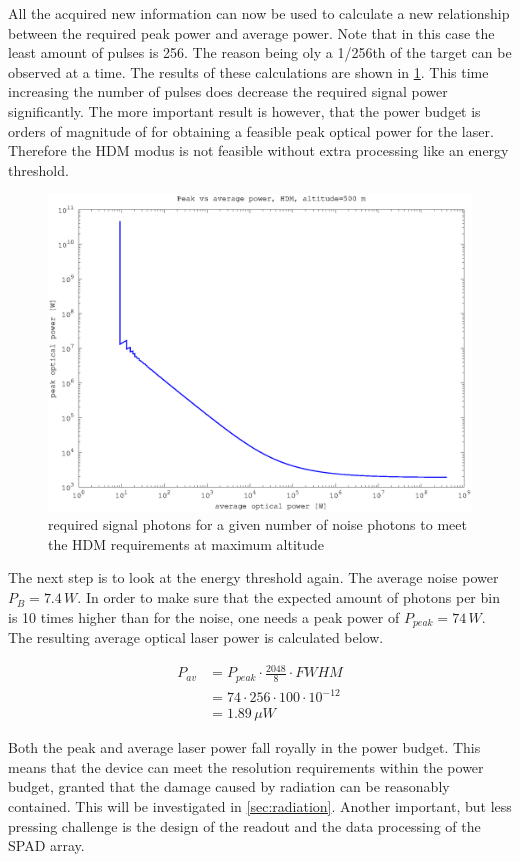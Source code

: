 All the acquired new information can now be used to calculate a new relationship between the required peak power and average power. Note that in this case the least amount of pulses is 256. The reason being oly a 1/256th of the target can be observed at a time. The results of these calculations are shown in \cref{fig:hdm_peak_vs_av}. This time increasing the number of pulses does decrease the required signal power significantly. The more important result is however, that the power budget is orders of magnitude of for obtaining a feasible peak optical power for the laser. Therefore the HDM modus is not feasible without extra processing like an energy threshold.

\begin{figure}[h]
\centering
	\includegraphics[width=0.8\linewidth]{fig/hdm_peak_vs_av.eps}
\caption{required signal photons for a given number of noise photons to meet the HDM requirements at maximum altitude}
\label{fig:hdm_peak_vs_av}
\end{figure}

The next step is to look at the energy threshold again. The average noise power $P_B=7.4\,W$. In order to make sure that the expected amount of photons per bin is 10 times higher than for the noise, one needs a peak power of $P_{peak}=74\,W$. The resulting average optical laser power is calculated below.

\begin{align*}
	P_{av}&=P_{peak}\cdot\frac{2048}{8}\cdot FWHM\\
	&= 74\cdot256\cdot100\cdot10^{-12}\\
	&= 1.89\,\mu W
\end{align*}

Both the peak and average laser power fall royally in the power budget. This means that the device can meet the resolution requirements within the power budget, granted that the damage caused by radiation can be reasonably contained. This will be investigated in \cref{sec:radiation}. Another important, but less pressing challenge is the design of the readout and the data processing of the SPAD array. 
